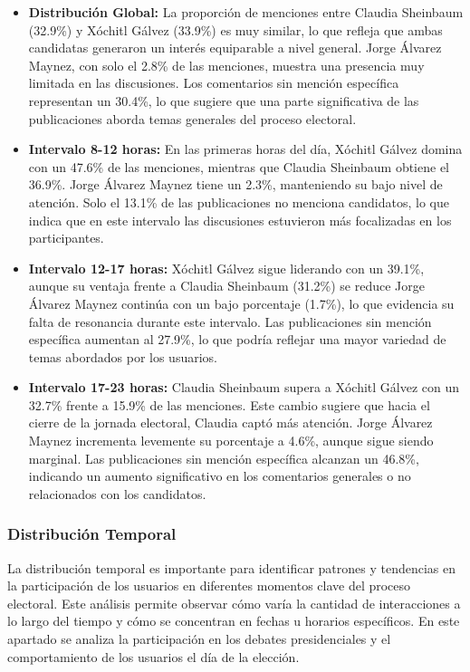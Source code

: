 \documentclass[10pt, a4paper]{article}
\begin{document}
	\newpage
	\begin{itemize}
		\item \textbf{Distribución Global:} La proporción de menciones entre Claudia Sheinbaum (32.9\%) y Xóchitl Gálvez (33.9\%) es muy similar, lo que refleja que ambas candidatas generaron un interés equiparable a nivel general. Jorge Álvarez Maynez, con solo el 2.8\% de las menciones, muestra una presencia muy limitada en las discusiones. Los comentarios sin mención específica representan un 30.4\%, lo que sugiere que una parte significativa de las publicaciones aborda temas generales del proceso electoral.
		
		\item \textbf{Intervalo 8-12 horas:} En las primeras horas del día, Xóchitl Gálvez domina con un 47.6\% de las menciones, mientras que Claudia Sheinbaum obtiene el 36.9\%. Jorge Álvarez Maynez tiene un 2.3\%, manteniendo su bajo nivel de atención. Solo el 13.1\% de las publicaciones no menciona candidatos, lo que indica que en este intervalo las discusiones estuvieron más focalizadas en los participantes.
		
		\item \textbf{Intervalo 12-17 horas:} Xóchitl Gálvez sigue liderando con un 39.1\%, aunque su ventaja frente a Claudia Sheinbaum (31.2\%) se reduce Jorge Álvarez Maynez continúa con un bajo porcentaje (1.7\%), lo que evidencia su falta de resonancia durante este intervalo. Las publicaciones sin mención específica aumentan al 27.9\%, lo que podría reflejar una mayor variedad de temas abordados por los usuarios.
		
		\item \textbf{Intervalo 17-23 horas:} Claudia Sheinbaum supera a Xóchitl Gálvez con un 32.7\% frente a 15.9\% de las menciones. Este cambio sugiere que hacia el cierre de la jornada electoral, Claudia captó más atención. Jorge Álvarez Maynez incrementa levemente su porcentaje a 4.6\%, aunque sigue siendo marginal. Las publicaciones sin mención específica alcanzan un 46.8\%, indicando un aumento significativo en los comentarios generales o no relacionados con los candidatos.
	\end{itemize}
	
	
	\subsubsection{Distribución Temporal}
	
	La distribución temporal es importante para identificar patrones y tendencias en la participación de los usuarios en diferentes momentos clave del proceso electoral. Este análisis permite observar cómo varía la cantidad de interacciones a lo largo del tiempo y cómo se concentran en fechas u horarios específicos. En este apartado se analiza la participación en los debates presidenciales y el comportamiento de los usuarios el día de la elección.
	
\end{document}

